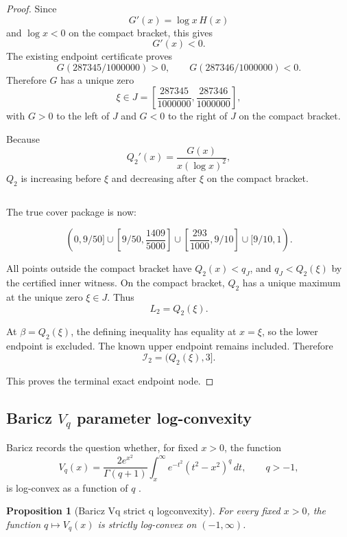 \documentclass[11pt]{article}
\numberwithin{equation}{section}
\newtheorem{proposition}[theorem]{Proposition}
\theoremstyle{definition}
\theoremstyle{remark}
\newcommand{\1}{\mathbf 1}
\begin{document}
\begin{proof}
Since
\[
G'(x)=\log x\,H(x)
\]
and \(\log x<0\) on the compact bracket, this gives
\[
G'(x)<0.
\]
The existing endpoint certificate proves
\[
G(287345/1000000)>0,
\qquad
G(287346/1000000)<0.
\]
Therefore \(G\) has a unique zero
\[
\xi\in J=\left[\frac{287345}{1000000},\frac{287346}{1000000}\right],
\]
with \(G>0\) to the left of \(J\) and \(G<0\) to the right of \(J\) on the compact bracket.

Because
\[
Q_2'(x)=\frac{G(x)}{x(\log x)^2},
\]
\(Q_2\) is increasing before \(\xi\) and decreasing after \(\xi\) on the compact bracket.


\begin{verbatim}
\end{verbatim}

The true cover package is now:

\[
(0,9/50]\cup
\left[9/50,\frac{1409}{5000}\right]\cup
\left[\frac{293}{1000},9/10\right]\cup
[9/10,1).
\]

All points outside the compact bracket have \(Q_2(x)<q_J\), and \(q_J<Q_2(\xi)\) by the certified inner witness. On the compact bracket, \(Q_2\) has a unique maximum at the unique zero \(\xi\in J\). Thus
\[
L_2=Q_2(\xi).
\]

At \(\beta=Q_2(\xi)\), the defining inequality has equality at \(x=\xi\), so the lower endpoint is excluded. The known upper endpoint remains included. Therefore
\[
\mathcal I_2=(Q_2(\xi),3].
\]

This proves the terminal exact endpoint node.
\end{proof}

\subsection{Baricz \(V_q\) parameter log-convexity}

Baricz records the question whether, for fixed \(x>0\), the function
\begin{equation}
\label{eq:baricz-vq-definition}
V_q(x)=\frac{2e^{x^2}}{\Gamma(q+1)}
\int_x^\infty e^{-t^2}(t^2-x^2)^q\,dt,
\qquad q>-1,
\end{equation}
is log-convex as a function of \(q\) \cite{baricz-turan-thesis}.

\begin{proposition}[Baricz Vq strict q logconvexity]
\label{res:baricz-vq-strict-q-logconvexity}
For every fixed \(x>0\), the function \(q\mapsto V_q(x)\) is strictly log-convex on \((-1,\infty)\).
\end{proposition}
\end{document}
